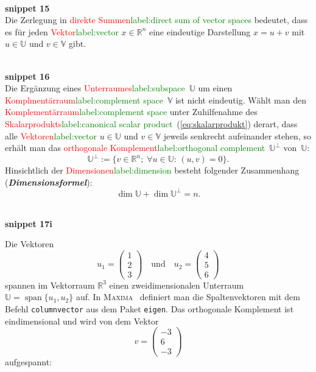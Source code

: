 \documentclass[a4paper,twoside,english,ngerman,deutsch,german,sectrefs,envcountsame,envcountchap]{svmono}
\newcommand{\setref}[2]{\textcolor{red}{#1}\textcolor{green}{#2}}
\newcommand{\snippet}[1]{\\\textbf{snippet #1}\\}
\begin{document}
\snippet{15}
Die Zerlegung in \setref{direkte Summen}{label:direct sum of vector spaces} bedeutet, dass es für jeden \setref{Vektor}{label:vector} $x\in{\mathbb{R}}^{n}$ eine eindeutige Darstellung $x=u+v$ mit $u\in\mathbb{U}$ und $v\in\mathbb{V}$ gibt.

\snippet{16}
Die Ergänzung eines \setref{Unterraumes}{label:subspace}~$\mathbb{U}$ um einen \setref{Komplmentärraum}{label:complement space}~$\mathbb{V}$ ist nicht eindeutig. Wählt man den \setref{Komplementärraum}{label:complement space} unter Zuhilfenahme des \setref{Skalarprodukts}{label:canonical scalar product}~(\ref{eq:skalarprodukt}) derart, dass alle \setref{Vektoren}{label:vector} $u\in\mathbb{U}$ und $v\in\mathbb{V}$ jeweils senkrecht aufeinander stehen, so erhält man das \setref{orthogonale Komplement}{label:orthogonal complement}~$\mathbb{U}^{\perp}$ von~$\mathbb{U}$:
\begin{equation}
\mathbb{U}^{\perp}:=\{v\in{\mathbb{R}}^{n};\;\forall u\in\mathbb{U}:\,(u,v)=0\}.\label{eq:ortho-komplement}
\end{equation}
Hinsichtlich der \setref{Dimensionen}{label:dimension} besteht folgender Zusammenhang (\textbf{\em Dimensionsformel}):
\begin{equation}
\dim\mathbb{U}+\dim\mathbb{U}^{\perp}=n.\label{eq:dimensionsformel-ortho-kompl}
\end{equation}

\snippet{17i}

\begin{example}
\label{exa:orthogonales-Komplement}Die Vektoren
\[
u_{1}=\left(\begin{array}{c} 1\\ 2\\ 3
\end{array}\right)\quad\text{und}\quad u_{2}=\left(\begin{array}{c}
4\\ 5\\ 6
\end{array}\right)
\]
spannen im Vektorraum ${\mathbb{R}}^{3}$ einen zweidimensionalen Unterraum $\mathbb{U}={\operatorname{span}}\{u_{1},u_{2}\}$ auf. In \textsc{Maxima}~\cite{maxima,haager2014} definiert man die Spaltenvektoren mit dem Befehl \texttt{columnvector} aus dem Paket \texttt{eigen}. Das orthogonale Komplement ist eindimensional und wird von dem Vektor
\[
v=\left(\begin{array}{c} -3\\ 6\\ -3
\end{array}\right)
\]
aufgespannt:


\end{example}
\end{document}
